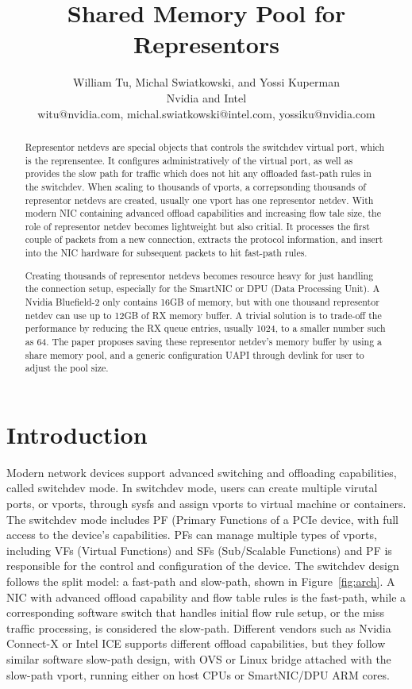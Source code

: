 \documentclass[letterpaper]{article}
\title{Shared Memory Pool for Representors}
\author{William Tu, Michal Swiatkowski, and Yossi Kuperman\\
Nvidia and Intel\\
witu@nvidia.com, michal.swiatkowski@intel.com, yossiku@nvidia.com\\
\newline
\newline
}
\begin{document}
 
\maketitle
\begin{abstract}
Representor netdevs are special objects that controls the switchdev
virtual port, which is the reprensentee. It configures administratively
of the virtual port, as well as provides the slow path for traffic which
does not hit any offloaded fast-path rules in the switchdev.
When scaling to thousands of vports, a correpsonding thousands of
representor netdevs are created, usually one vport has one representor
netdev. With modern NIC containing advanced offload capabilities %
and increasing flow tale size, the role of representor netdev becomes
lightweight but also critial. It processes the first couple of packets
from a new connection, extracts the protocol information, and insert
into the NIC hardware for subsequent packets to hit fast-path rules. 

Creating thousands of representor netdevs becomes resource heavy for
just handling the connection setup, especially for the SmartNIC or
DPU (Data Processing Unit). A Nvidia Bluefield-2 only contains 16GB
of memory, but with one thousand representor netdev can use up to
12GB of RX memory buffer. A trivial solution is to trade-off the
performance by reducing the RX queue entries, usually 1024, to a
smaller number such as 64. The paper proposes saving these representor
netdev's memory buffer by using a share memory pool, and a generic
configuration UAPI through devlink for user to adjust the pool size. 
 
\end{abstract}

\section{Introduction}
Modern network devices support advanced switching and offloading
capabilities, called switchdev mode. In switchdev mode, users can
create multiple virutal ports, or vports, through sysfs and assign
vports to virtual machine or containers. The switchdev mode includes
PF (Primary Functions of a PCIe device, with full access to the device's
capabilities. PFs can manage multiple types of vports, including
VFs (Virtual Functions) and SFs (Sub/Scalable Functions) and PF is
responsible for the control and configuration of the device.
The switchdev design follows the split model: a fast-path and slow-path, shown in Figure~\ref{fig:arch}.
A NIC with advanced offload capability and flow table rules is
the fast-path, while a corresponding software switch that handles
initial flow rule setup, or the miss traffic processing, is considered the
slow-path. Different vendors such as Nvidia Connect-X or Intel ICE
supports different offload capabilities, but they follow similar
software slow-path design, with OVS or Linux bridge attached with
the slow-path vport, running either on host CPUs or SmartNIC/DPU
ARM cores.
\end{document}
